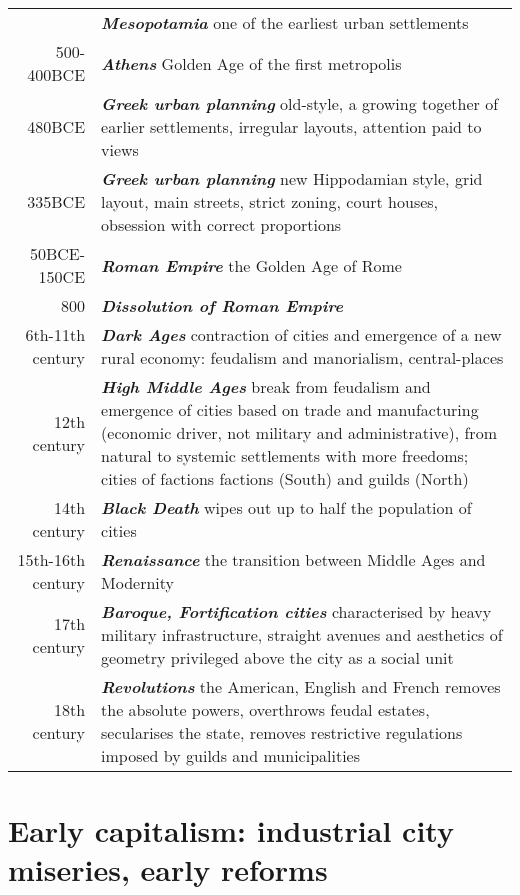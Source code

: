 \documentclass{article}
\newcommand{\foo}{\hspace{-2.3pt}$\bullet$ \hspace{5pt} }
\newcommand{\bisection}[1]{\textbf{\textit{#1}}}
\begin{document}
\begin{tabular}{r |@{\foo} p{}}
 & \bisection{Mesopotamia} one of the earliest urban settlements \\
500-400BCE & \bisection{Athens} Golden Age of the first metropolis \\
480BCE  & \bisection{Greek urban planning} old-style, a growing together of earlier settlements, irregular layouts, attention paid to views \\
335BCE  & \bisection{Greek urban planning} new Hippodamian style, grid layout, main streets, strict zoning, court houses, obsession with correct proportions \\
50BCE-150CE & \bisection{Roman Empire} the Golden Age of Rome \\
800 & \bisection{Dissolution of Roman Empire} \\
6th-11th century & \bisection{Dark Ages} contraction of cities and emergence of a new rural economy: feudalism and manorialism, central-places \\
12th century & \bisection{High Middle Ages} break from feudalism and emergence of cities based on trade and manufacturing (economic driver, not military and administrative), from natural to systemic settlements with more freedoms; cities of factions factions (South) and guilds (North) \\
14th century & \bisection{Black Death} wipes out up to half the population of cities \\
15th-16th century & \bisection{Renaissance} the transition between Middle Ages and Modernity \\
17th century & \bisection{Baroque, Fortification cities} characterised by heavy military infrastructure, straight avenues and aesthetics of geometry privileged above the city as a social unit \\
18th century & \bisection{Revolutions} the American, English and French removes the absolute powers, overthrows feudal estates, secularises the state, removes restrictive regulations imposed by guilds and municipalities \\

\end{tabular}


\pagebreak
\section{Early capitalism: industrial city miseries, early reforms}
\end{document}

